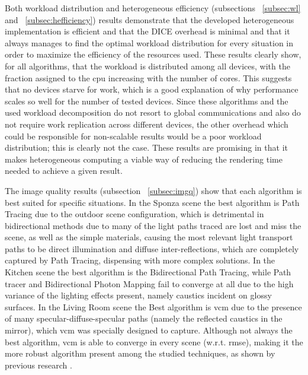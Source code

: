 Both workload distribution and heterogeneous efficiency (subsections ~\ref{subsec:wl} and ~\ref{subsec:hefficiency}) results demonstrate that the developed heterogeneous implementation is efficient and that the DICE overhead is minimal and that it always manages to find the optimal workload distribution for every situation in order to maximize the efficiency of the resources used. These results clearly show, for all algorithms, that the workload is distributed among all devices, with the fraction assigned to the \gls{cpu} increasing with the number of cores. This suggests that no devices starve for work, which is a good explanation of why performance scales so well for the number of tested devices. Since these algorithms and the used workload decomposition do not resort to global communications and also do not require work replication across different devices, the other overhead which could be responsible for non-scalable results would be a poor workload distribution; this is clearly not the case. These results are promising in that it makes heterogeneous computing a viable way of reducing the rendering time needed to achieve a given result.

The image quality results (subsection ~\ref{subsec:imgq}) show that each algorithm is best suited for specific situations. In the Sponza scene the best algorithm is Path Tracing due to the outdoor scene configuration, which is detrimental in bidirectional methods due to many of the light paths traced are lost and miss the scene, as well as the simple materials, causing the most relevant light transport paths to be direct illumination and diffuse inter-reflections, which are completely captured by Path Tracing, dispensing with more complex solutions. In the Kitchen scene the best algorithm is the Bidirectional Path Tracing, while Path tracer and Bidirectional Photon Mapping fail to converge at all due to the high variance of the lighting effects present, namely caustics incident on glossy surfaces. In the Living Room scene the Best algorithm is \gls{vcm} due to the presence of many specular-diffuse-specular paths (namely the reflected caustics in the mirror), which \gls{vcm} was specially designed to capture. Although not always the best algorithm, \gls{vcm} is able to converge in every scene (w.r.t. \gls{rmse}), making it the more robust algorithm present among the studied techniques, as shown by previous research \citep{davidovivc2014progressive}.


